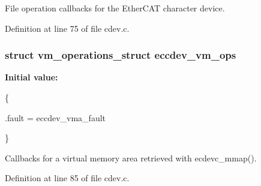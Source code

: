 File operation callbacks for the Ether\-C\-A\-T character device. 



Definition at line 75 of file cdev.\-c.

\subsubsection[{eccdev\-\_\-vm\-\_\-ops}]{\setlength{\rightskip}{0pt plus 5cm}struct vm\-\_\-operations\-\_\-struct eccdev\-\_\-vm\-\_\-ops}\label{cdev_8c_ac0b3a174ec0e5531598931789b842ca0}
{\bfseries Initial value\-:}
\begin{DoxyCode}
 \{

    .fault = eccdev_vma_fault



\}
\end{DoxyCode}


Callbacks for a virtual memory area retrieved with ecdevc\-\_\-mmap(). 



Definition at line 85 of file cdev.\-c.

